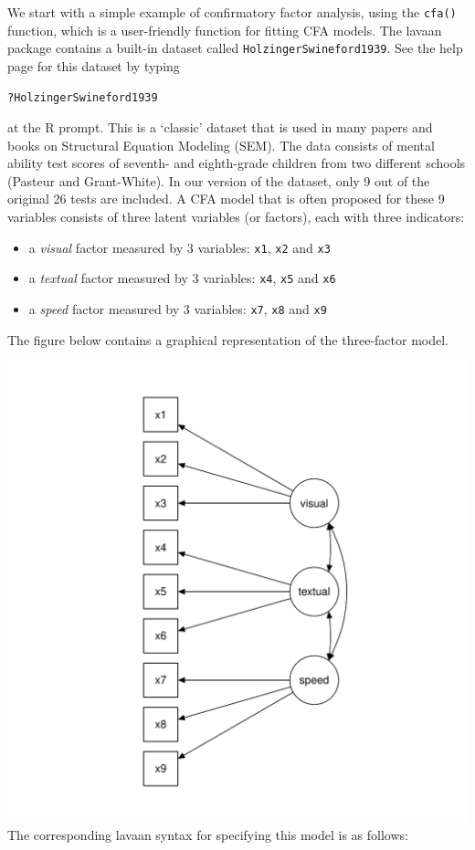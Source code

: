 We start with a simple example of confirmatory factor analysis, using
the \texttt{cfa()} function, which is a user-friendly function for
fitting CFA models. The lavaan package contains a built-in dataset
called \texttt{HolzingerSwineford1939}. See the help page for this
dataset by typing

\begin{verbatim}
?HolzingerSwineford1939
\end{verbatim}

at the R prompt. This is a `classic' dataset that is used in many papers
and books on Structural Equation Modeling (SEM). The data consists of
mental ability test scores of seventh- and eighth-grade children from
two different schools (Pasteur and Grant-White). In our version of the
dataset, only 9 out of the original 26 tests are included. A CFA model
that is often proposed for these 9 variables consists of three latent
variables (or factors), each with three indicators:

\begin{itemize}
\tightlist
\item
  a \emph{visual} factor measured by 3 variables: \texttt{x1},
  \texttt{x2} and \texttt{x3}
\item
  a \emph{textual} factor measured by 3 variables: \texttt{x4},
  \texttt{x5} and \texttt{x6}
\item
  a \emph{speed} factor measured by 3 variables: \texttt{x7},
  \texttt{x8} and \texttt{x9}
\end{itemize}

The figure below contains a graphical representation of the three-factor
model.

\includegraphics{figure/cfa-1.pdf} The corresponding lavaan syntax for
specifying this model is as follows:

